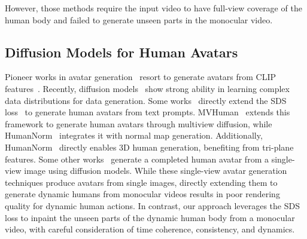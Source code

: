 However, those methods require the input video to have full-view coverage of the human body and failed to generate unseen parts in the monocular video.


\subsection{Diffusion Models for Human Avatars}

Pioneer works in avatar generation~\cite{hong2022avatarclip} resort to generate avatars from CLIP features~\cite{radford2021learning}. Recently, diffusion models~\cite{ho2020denoising} show strong ability in learning complex data distributions for data generation. Some works~\cite{zhang2023avatarverse,huang2024dreamwaltz,kolotouros2024dreamhuman,zeng2023avatarbooth,cao2023dreamavatar,jiang2023avatarcraft,zhang2023styleavatar3d,kim2023chupa,cao2023guide3d,mendiratta2023avatarstudio,liao2023tada,wang2023disentangled,liu2023humangaussian,xu2023seeavatar,wang2023humancoser} directly extend the SDS loss~\cite{poole2022dreamfusion} to generate human avatars from text prompts. MVHuman~\cite{jiang2023mvhuman} extends this framework to generate human avatars through multiview diffusion, while HumanNorm~\cite{huang2023humannorm} integrates it with normal map generation. Additionally, HumanNorm~\cite{hu2023humanliff} directly enables 3D human generation, benefiting from tri-plane features. Some other works~\cite{huang2023tech,svitov2023dinar,alldieck2022photorealistic,zhang2023humanref,albahar2023single,ho2024sith,chen2024ghgsingleview,pan2024hsgsingleimagehuman,sun2024occfusion} generate a completed human avatar from a single-view image using diffusion models. 
While these single-view avatar generation techniques produce avatars from single images, directly extending them to generate dynamic humans from monocular videos results in poor rendering quality for dynamic human actions. In contrast, our approach leverages the SDS loss to inpaint the unseen parts of the dynamic human body from a monocular video, with careful consideration of time coherence, consistency, and dynamics. %

